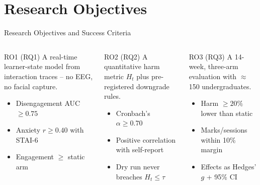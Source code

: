 \documentclass[10pt]{beamer}
\begin{document}
\section{Research Objectives}

\begin{frame}{Research Objectives and Success Criteria}
\begin{columns}[T]
    \begin{block}{RO1 (RQ1)}
        A real-time learner-state model from interaction traces -- no EEG, no facial capture.
        \vspace{2pt}
        \begin{itemize}\itemsep0pt
            \item Disengagement AUC $\ge 0.75$
            \item Anxiety $r \ge 0.40$ with STAI-6
            \item Engagement $\ge$ static arm
        \end{itemize}
    \end{block}
    \begin{block}{RO2 (RQ2)}
        A quantitative harm metric $H_t$ plus pre-registered downgrade rules.
        \vspace{2pt}
        \begin{itemize}\itemsep0pt
            \item Cronbach's $\alpha \ge 0.70$
            \item Positive correlation with self-report
            \item Dry run never breaches $H_t \le \tau$
        \end{itemize}
    \end{block}
    \begin{block}{RO3 (RQ3)}
        A 14-week, three-arm evaluation with $\approx$150 undergraduates.
        \vspace{2pt}
        \begin{itemize}\itemsep0pt
            \item Harm $\ge 20\%$ lower than static
            \item Marks/sessions within 10\% margin
            \item Effects as Hedges' $g$ + 95\% CI
        \end{itemize}
    \end{block}
\end{columns}
\end{frame}
\end{document}
